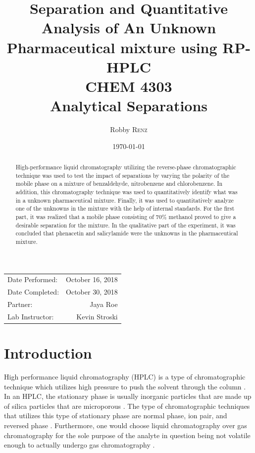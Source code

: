 \documentclass[a4paper, 12pt]{article}
\title{Separation and Quantitative Analysis of An Unknown Pharmaceutical mixture using RP-HPLC \\ CHEM 4303 \\ Analytical Separations} %
\author{Robby \textsc{Renz}} %
\date{\today} %
\begin{document}
\maketitle %

\begin{center}
\begin{tabular}{l r}
Date Performed: & October 16, 2018 \\ %
Date Completed: & October 30, 2018 \\
Partner: & Jaya Roe \\ %
Lab Instructor: & Kevin Stroski %
\end{tabular}
\end{center}


\begin{abstract}
	High-performance liquid chromatography utilizing the reverse-phase chromatographic technique was used to test the impact of separations by varying the polarity of the mobile phase on a mixture of benzaldehyde, nitrobenzene and chlorobenzene. In addition, this chromatography technique was used to quantitatively identify what was in a unknown pharmaceutical mixture. Finally, it was used to quantitatively analyze one of the unknowns in the mixture with the help of internal standards. For the first part, it was realized that a mobile phase consisting of $70\%$ methanol proved to give a desirable separation for the mixture. In the qualitative part of the experiment, it was concluded that phenacetin and salicylamide were the unknowns in the pharmaceutical mixture.
\end{abstract}
\newpage


\section{Introduction}
High performance liquid chromatography (HPLC) is a type of chromatographic technique which utilizes high pressure to push the solvent through the column \cite{harris}. In an HPLC, the stationary phase is usually inorganic particles that are made up of silica particles that are microporous \cite{harris}. The type of chromatographic techniques that utilizes this type of stationary phase are normal phase, ion pair, and reversed phase \cite{mold}. Furthermore, one would choose liquid chromatography over gas chromatography for the sole purpose of the analyte in question being not volatile enough to actually undergo gas chromatography \cite{harris}.
\end{document}
